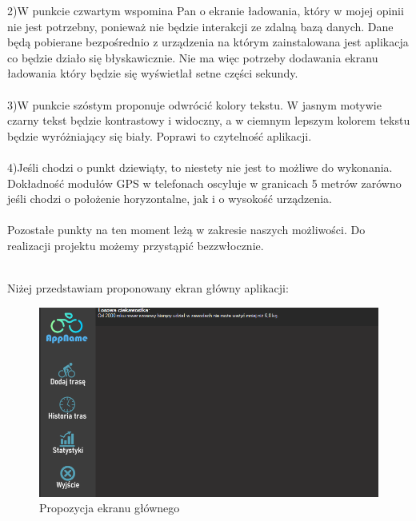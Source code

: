 {2)W punkcie czwartym wspomina Pan o ekranie ładowania, który w mojej opinii nie jest potrzebny, ponieważ nie będzie interakcji ze zdalną bazą danych. Dane będą pobierane bezpośrednio z urządzenia na którym zainstalowana jest aplikacja co będzie działo się błyskawicznie. Nie ma więc potrzeby dodawania ekranu ładowania który będzie się wyświetlał setne części sekundy. \\\\
3)W punkcie szóstym proponuje odwrócić kolory tekstu. W jasnym motywie czarny tekst będzie kontrastowy i widoczny, a w ciemnym lepszym kolorem tekstu będzie wyróżniający się biały. Poprawi to czytelność aplikacji. \\\\
4)Jeśli chodzi o punkt dziewiąty, to niestety nie jest to możliwe do wykonania. Dokładność modułów GPS w telefonach oscyluje w granicach 5 metrów zarówno jeśli chodzi o położenie horyzontalne, jak i o wysokość urządzenia. \\\\
Pozostałe punkty na ten moment leżą w zakresie naszych możliwości. Do realizacji projektu możemy przystąpić bezzwłocznie.
}

\textit\\{
Niżej przedstawiam proponowany ekran główny aplikacji:
}
	\begin{figure}[!htb]
	\begin{center}
		\includegraphics[width=15cm]{rys/main_screen.png}
		\caption{Propozycja ekranu głównego}
		\label{rys:Propozycja ekranu głównego}
	\end{center}
\end{figure}


